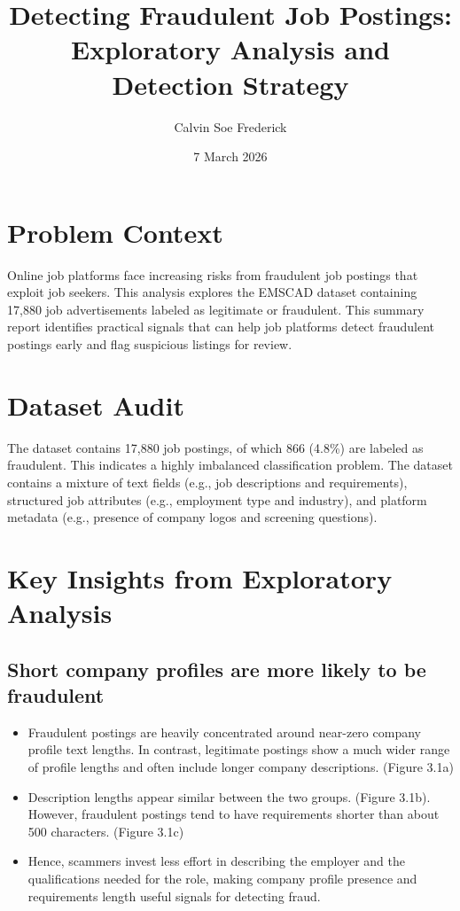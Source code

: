 \documentclass[11pt]{article}
\title{Detecting Fraudulent Job Postings:\\Exploratory Analysis and Detection Strategy}
\author{Calvin Soe Frederick}
\date{7 March 2026}
\begin{document}
\maketitle

\section{Problem Context}

Online job platforms face increasing risks from fraudulent job postings that exploit job seekers. 
This analysis explores the EMSCAD dataset containing 17,880 job advertisements labeled as legitimate or fraudulent. This summary report identifies practical signals that can help job platforms detect fraudulent postings early and flag suspicious listings for review.

\section{Dataset Audit}

The dataset contains 17,880 job postings, of which 866 (4.8\%) are labeled as fraudulent. This indicates a highly imbalanced classification problem. The dataset contains a mixture of text fields (e.g., job descriptions and requirements),
structured job attributes (e.g., employment type and industry), and platform metadata (e.g., presence of company logos and screening questions). 

\section{Key Insights from Exploratory Analysis}

\subsection{Short company profiles are more likely to be fraudulent}

\begin{itemize}
\item Fraudulent postings are heavily concentrated around near-zero company profile text lengths. In contrast, legitimate postings show a much wider range of profile lengths and often include longer company descriptions. (Figure 3.1a)
\item Description lengths appear similar between the two groups. (Figure 3.1b). However, fraudulent postings tend to have requirements shorter than about 500 characters. (Figure 3.1c)
\item Hence, scammers invest less effort in describing the employer and the qualifications needed for the role, making company profile presence and requirements length useful signals for detecting fraud.
\end{itemize}
\end{document}
